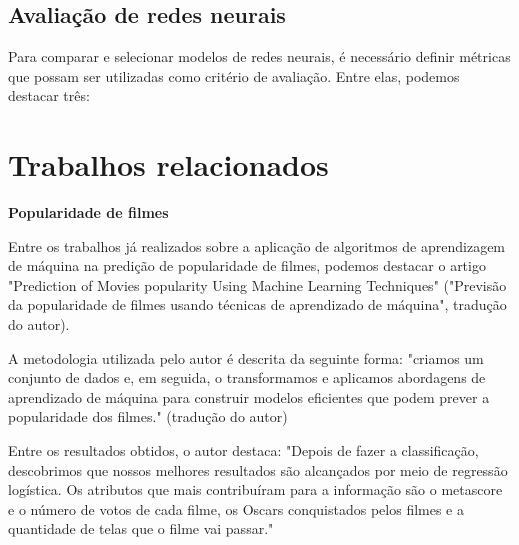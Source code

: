 	    \subsection{Avaliação de redes neurais}
	    Para comparar e selecionar modelos de redes neurais, é necessário definir métricas que possam ser utilizadas como critério de avaliação. Entre elas, podemos destacar três:\newline




    \section{Trabalhos relacionados}

        \textbf{Popularidade de filmes}\par

        Entre os trabalhos já realizados sobre a aplicação de algoritmos de aprendizagem de máquina na predição de popularidade de filmes, podemos destacar o artigo "Prediction of Movies popularity Using Machine Learning Techniques" ("Previsão da popularidade de filmes usando técnicas de aprendizado de máquina", tradução do autor).\par
        A metodologia utilizada pelo autor é descrita da seguinte forma: "criamos um conjunto de dados e, em seguida, o transformamos e aplicamos abordagens de aprendizado de máquina para construir modelos eficientes que podem prever a popularidade dos filmes." \cite{afzal2016} (tradução do autor)\par
        Entre os resultados obtidos, o autor destaca: "Depois de fazer a classificação, descobrimos que nossos melhores resultados são alcançados por meio de regressão logística. Os atributos que mais contribuíram para a informação são o metascore e o número de votos de cada filme, os Oscars conquistados pelos filmes e a quantidade de telas que o filme vai passar." \cite{afzal2016}\newline

